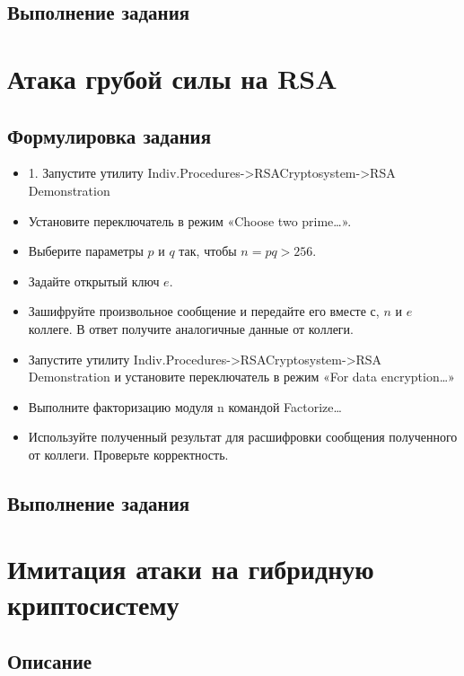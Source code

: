 \documentclass[a4paper, 14pt]{extarticle}
\begin{document}
\subsection{Выполнение задания}
\lipsum[1] %

\section{Атака грубой силы на RSA}
\subsection{Формулировка задания}
\begin{itemize}
    \item 1. Запустите утилиту Indiv.Procedures->RSACryptosystem->RSA Demonstration
    \item  Установите переключатель в режим «Choose two prime…».
    \item  Выберите параметры $p$ и $q$ так, чтобы $n=pq> 256$.
    \item  Задайте открытый ключ $e$.
    \item  Зашифруйте произвольное сообщение и передайте его вместе $с$, $n$ и $e$ коллеге. В ответ получите аналогичные данные от коллеги.
    \item  Запустите утилиту Indiv.Procedures->RSACryptosystem->RSA Demonstration и установите переключатель в режим «For data encryption…»
    \item  Выполните факторизацию модуля n командой Factorize…
    \item  Используйте полученный результат для расшифровки сообщения полученного от коллеги. Проверьте корректность.
\end{itemize}

\subsection{Выполнение задания}
\lipsum[1] %

\section{Имитация атаки на гибридную криптосистему}
\subsection{Описание}
\lipsum[1] %
\end{document}
